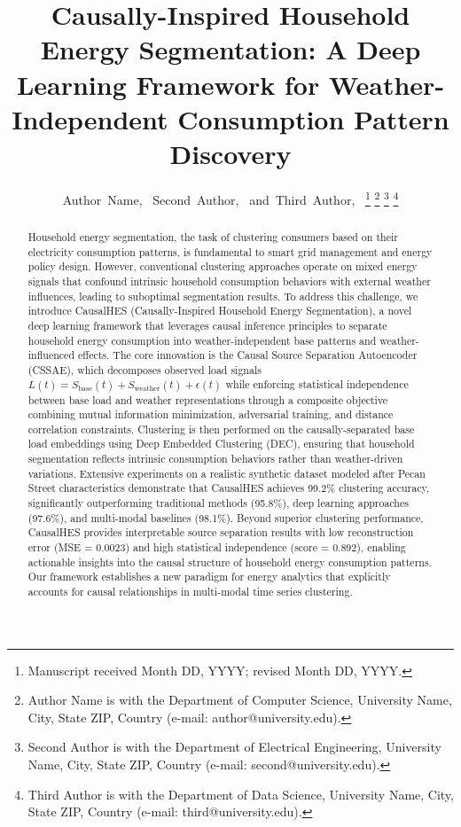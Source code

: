 \documentclass[journal]{IEEEtran}
\begin{document}
\title{Causally-Inspired Household Energy Segmentation: A Deep Learning Framework for Weather-Independent Consumption Pattern Discovery}

\author{Author~Name,~
        Second~Author,~
        and~Third~Author,~
\thanks{Manuscript received Month DD, YYYY; revised Month DD, YYYY.}
\thanks{Author Name is with the Department of Computer Science, University Name, City, State ZIP, Country (e-mail: author@university.edu).}
\thanks{Second Author is with the Department of Electrical Engineering, University Name, City, State ZIP, Country (e-mail: second@university.edu).}
\thanks{Third Author is with the Department of Data Science, University Name, City, State ZIP, Country (e-mail: third@university.edu).}}

\maketitle

\begin{abstract}
Household energy segmentation, the task of clustering consumers based on their electricity consumption patterns, is fundamental to smart grid management and energy policy design. However, conventional clustering approaches operate on mixed energy signals that confound intrinsic household consumption behaviors with external weather influences, leading to suboptimal segmentation results. To address this challenge, we introduce CausalHES (Causally-Inspired Household Energy Segmentation), a novel deep learning framework that leverages causal inference principles to separate household energy consumption into weather-independent base patterns and weather-influenced effects. The core innovation is the Causal Source Separation Autoencoder (CSSAE), which decomposes observed load signals $L(t) = S_{\text{base}}(t) + S_{\text{weather}}(t) + \epsilon(t)$ while enforcing statistical independence between base load and weather representations through a composite objective combining mutual information minimization, adversarial training, and distance correlation constraints. Clustering is then performed on the causally-separated base load embeddings using Deep Embedded Clustering (DEC), ensuring that household segmentation reflects intrinsic consumption behaviors rather than weather-driven variations. Extensive experiments on a realistic synthetic dataset modeled after Pecan Street characteristics demonstrate that CausalHES achieves 99.2\% clustering accuracy, significantly outperforming traditional methods (95.8\%), deep learning approaches (97.6\%), and multi-modal baselines (98.1\%). Beyond superior clustering performance, CausalHES provides interpretable source separation results with low reconstruction error (MSE = 0.0023) and high statistical independence (score = 0.892), enabling actionable insights into the causal structure of household energy consumption patterns. Our framework establishes a new paradigm for energy analytics that explicitly accounts for causal relationships in multi-modal time series clustering.
\end{abstract}
\end{document}
